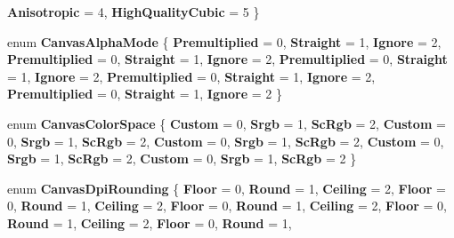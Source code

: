 \begin{DoxyCompactItemize}
{\bfseries Anisotropic} = 4, 
{\bfseries High\+Quality\+Cubic} = 5
 \}
\item 
\mbox{\label{namespace_microsoft_1_1_graphics_1_1_canvas_a1ab747c729197befb5d2c28b22e08bc3}} 
enum {\bfseries Canvas\+Alpha\+Mode} \{ \newline
{\bfseries Premultiplied} = 0, 
{\bfseries Straight} = 1, 
{\bfseries Ignore} = 2, 
{\bfseries Premultiplied} = 0, 
\newline
{\bfseries Straight} = 1, 
{\bfseries Ignore} = 2, 
{\bfseries Premultiplied} = 0, 
{\bfseries Straight} = 1, 
\newline
{\bfseries Ignore} = 2, 
{\bfseries Premultiplied} = 0, 
{\bfseries Straight} = 1, 
{\bfseries Ignore} = 2, 
\newline
{\bfseries Premultiplied} = 0, 
{\bfseries Straight} = 1, 
{\bfseries Ignore} = 2
 \}
\item 
\mbox{\label{namespace_microsoft_1_1_graphics_1_1_canvas_a968dbdb8c3779105d9af1ee42d19efa5}} 
enum {\bfseries Canvas\+Color\+Space} \{ \newline
{\bfseries Custom} = 0, 
{\bfseries Srgb} = 1, 
{\bfseries Sc\+Rgb} = 2, 
{\bfseries Custom} = 0, 
\newline
{\bfseries Srgb} = 1, 
{\bfseries Sc\+Rgb} = 2, 
{\bfseries Custom} = 0, 
{\bfseries Srgb} = 1, 
\newline
{\bfseries Sc\+Rgb} = 2, 
{\bfseries Custom} = 0, 
{\bfseries Srgb} = 1, 
{\bfseries Sc\+Rgb} = 2, 
\newline
{\bfseries Custom} = 0, 
{\bfseries Srgb} = 1, 
{\bfseries Sc\+Rgb} = 2
 \}
\item 
\mbox{\label{namespace_microsoft_1_1_graphics_1_1_canvas_aaf9bdf2614ae3a2c3978ef7522070d82}} 
enum {\bfseries Canvas\+Dpi\+Rounding} \{ \newline
{\bfseries Floor} = 0, 
{\bfseries Round} = 1, 
{\bfseries Ceiling} = 2, 
{\bfseries Floor} = 0, 
\newline
{\bfseries Round} = 1, 
{\bfseries Ceiling} = 2, 
{\bfseries Floor} = 0, 
{\bfseries Round} = 1, 
\newline
{\bfseries Ceiling} = 2, 
{\bfseries Floor} = 0, 
{\bfseries Round} = 1, 
{\bfseries Ceiling} = 2, 
\newline
{\bfseries Floor} = 0, 
{\bfseries Round} = 1, 

\end{DoxyCompactItemize}
